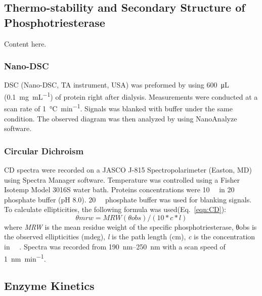 \begin{refsection}
\subsection{Thermo-stability and Secondary Structure of Phosphotriesterase}
\label{sec:thermo}

Content here.

\subsubsection{Nano-DSC}
\label{sec:dsc}

DSC (Nano-DSC, TA instrument, USA) was preformed by using \SI{600}{\micro\L}
(\SI{0.1}{\mg\per\mL}) of protein right after dialysis. Measurements were
conducted at a scan rate of \SI{1}{\celsius\per\minute}. Signals was blanked with
buffer under the same condition.  The observed diagram was then analyzed by
using NanoAnalyze software.

\subsubsection{Circular Dichroism}
\label{sec:cd}

CD spectra were recorded on a JASCO J-815 Spectropolarimeter (Easton, MD) using
Spectra Manager software. Temperature was controlled using a Fisher Isotemp
Model 3016S water bath. Proteins concentrations were \SI{10}{\micro\Molar} in
\SI{20}{\milli\Molar} phosphate buffer (pH 8.0). \SI{20}{\milli\Molar}
phosphate buffer was used for blanking signals. To calculate ellipticities, the
following formula was used(Eq.~\ref{eqn:CD}): 
\begin{equation}
    θmrw = MRW(θobs) / (10 * c * l) 
    \label{eqn:CD}
\end{equation}
where \emph{MRW} is the mean residue weight of the specific phosphotriesterase,
θobs is the observed ellipticities (mdeg), \emph{l} is the path length (cm),
\emph{c} is the concentration in \SI{}{\micro\Molar}. Spectra was recorded from
\SIrange{190}{250}{\nm} with a scan speed of \SI{1}{\nano\meter\per\minute}.

\subsection{Enzyme Kinetics}
\label{sec:kinetics}


\end{refsection}
